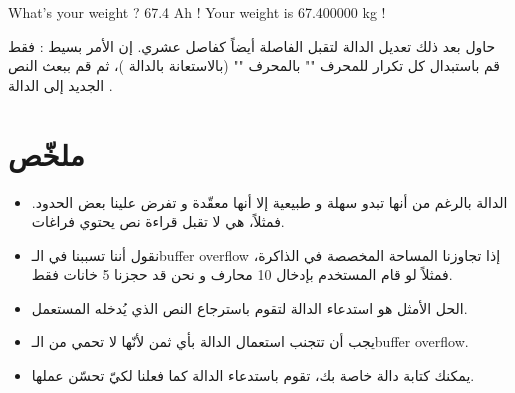 \begin{Console}
  What's your weight ? 67.4
  Ah ! Your weight is 67.400000 kg !
\end{Console}


حاول بعد ذلك تعديل الدالة
لتقبل الفاصلة أيضاً كفاصل عشري. إن الأمر بسيط : فقط قم باستبدال كل تكرار للمحرف
"\InlineCode{,}"
بالمحرف
""
(بالاستعانة بالدالة
)،
ثم قم ببعث النص الجديد إلى الدالة
.

\section*{ملخّص}

\begin{itemize}
  \item الدالة
بالرغم من أنها تبدو سهلة و طبيعية إلا أنها معقّدة و تفرض علينا بعض الحدود. فمثلاً، هي لا تقبل قراءة نص يحتوي فراغات.
  \item نقول أننا تسببنا في الـ\textenglish{buffer overflow}
إذا تجاوزنا المساحة المخصصة في الذاكرة، فمثلاً لو قام المستخدم بإدخال 10 محارف و نحن قد حجزنا 5 خانات فقط.
  \item الحل الأمثل هو استدعاء الدالة
لتقوم باسترجاع النص الذي يُدخله المستعمل.
  \item يجب أن تتجنب استعمال الدالة
بأي ثمن لأنّها لا تحمي من الـ\textenglish{buffer overflow}.
  \item يمكنك كتابة دالة خاصة بك، تقوم باستدعاء الدالة
كما فعلنا لكيّ تحسّن عملها.
\end{itemize}
